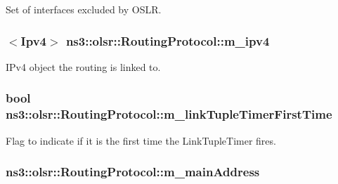 Set of interfaces excluded by O\+S\+LR. 

\subsubsection[{\texorpdfstring{m\+\_\+ipv4}{m_ipv4}}]{$<${\bf Ipv4}$>$ ns3\+::olsr\+::\+Routing\+Protocol\+::m\+\_\+ipv4\hspace{0.3cm}{\ttfamily [private]}}\hypertarget{classns3_1_1olsr_1_1RoutingProtocol_afede79b25ec57e797ff900ae01bca1df}{}\label{classns3_1_1olsr_1_1RoutingProtocol_afede79b25ec57e797ff900ae01bca1df}


I\+Pv4 object the routing is linked to. 

\subsubsection[{\texorpdfstring{m\+\_\+link\+Tuple\+Timer\+First\+Time}{m_linkTupleTimerFirstTime}}]{\setlength{\rightskip}{0pt plus 5cm}bool ns3\+::olsr\+::\+Routing\+Protocol\+::m\+\_\+link\+Tuple\+Timer\+First\+Time\hspace{0.3cm}{\ttfamily [private]}}\hypertarget{classns3_1_1olsr_1_1RoutingProtocol_ae6557d76350cf59d34d2aae8e9c79831}{}\label{classns3_1_1olsr_1_1RoutingProtocol_ae6557d76350cf59d34d2aae8e9c79831}


Flag to indicate if it is the first time the Link\+Tuple\+Timer fires. 

\subsubsection[{\texorpdfstring{m\+\_\+main\+Address}{m_mainAddress}}]{ ns3\+::olsr\+::\+Routing\+Protocol\+::m\+\_\+main\+Address\hspace{0.3cm}{\ttfamily [private]}}\hypertarget{classns3_1_1olsr_1_1RoutingProtocol_a58cc50ed5d1039aab603e90e318aabfb}{}\label{classns3_1_1olsr_1_1RoutingProtocol_a58cc50ed5d1039aab603e90e318aabfb}


